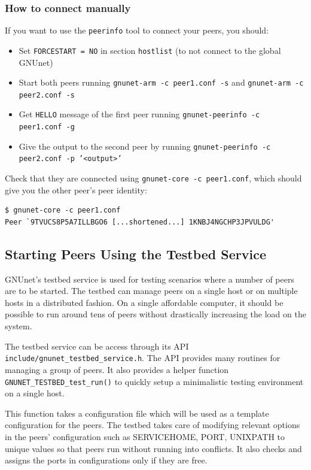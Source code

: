 \documentclass[10pt]{article}
\begin{document}
\subsubsection{How to connect manually}

If you want to use the \texttt{peerinfo} tool to connect your peers, you should:
\begin{itemize}
\itemsep0em
 \item{Set {\tt FORCESTART = NO} in section {\tt hostlist} (to not connect to the global GNUnet)}
 \item{Start both peers running {\tt gnunet-arm -c peer1.conf -s} and {\tt gnunet-arm -c peer2.conf -s}}
 \item{Get \texttt{HELLO} message of the first peer running {\tt gnunet-peerinfo -c peer1.conf -g}}
 \item{Give the output to the second peer by running {\tt gnunet-peerinfo -c peer2.conf -p '<output>'}}
\end{itemize}

Check that they are connected using {\tt gnunet-core -c peer1.conf}, which should give you the other peer's
peer identity:
\lstset{language=bash}
\begin{lstlisting}
$ gnunet-core -c peer1.conf
Peer `9TVUCS8P5A7ILLBGO6 [...shortened...] 1KNBJ4NGCHP3JPVULDG'
\end{lstlisting}

\subsection{Starting Peers Using the Testbed Service} \label{sec:testbed}

GNUnet's testbed service is used for testing scenarios where a number of peers
are to be started.  The testbed can manage peers on a single host or on multiple
hosts in a distributed fashion.  On a single affordable computer, it should be
possible to run around tens of peers without drastically increasing the load on the
system.

The testbed service can be access through its API
\texttt{include/gnunet\_testbed\_service.h}.  The API provides many routines for
managing a group of peers.  It also provides a helper function
\texttt{GNUNET\_TESTBED\_test\_run()} to quickly setup a minimalistic testing
environment on a single host.

This function takes a configuration file which will be used as a template
configuration for the peers.  The testbed takes care of modifying relevant
options in the peers' configuration such as SERVICEHOME, PORT, UNIXPATH to
unique values so that peers run without running into conflicts.  It also checks
and assigns the ports in configurations only if they are free.
\end{document}
